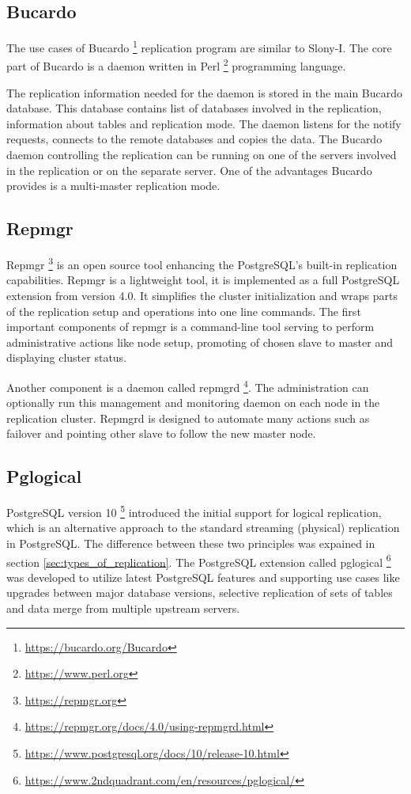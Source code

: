 \documentclass[
  digital, %
  twoside, %
  table,   %
  lof,     %
  lot,     %
]{fithesis3}
\begin{document}
\subsection{Bucardo}
The use cases of Bucardo \footnote{\url{https://bucardo.org/Bucardo}} replication program are similar to Slony-I. The core part of Bucardo is a daemon written in Perl \footnote{\url{https://www.perl.org}} programming language.

The replication information needed for the daemon is stored in the main Bucardo database. This database contains list of databases involved in the replication, information about tables and replication mode. The daemon listens for the notify requests, connects to the remote databases and copies the data. The Bucardo daemon controlling the replication can be running on one of the servers involved in the replication or on the separate server. One of the advantages Bucardo provides is a multi-master replication mode.

\subsection{Repmgr} \label{sec:repmgr}
Repmgr \footnote{\url{https://repmgr.org}} is an open source tool enhancing the PostgreSQL's built-in replication capabilities. Repmgr is a lightweight tool, it is implemented as a full PostgreSQL extension from version 4.0. It simplifies the cluster initialization and wraps parts of the replication setup and operations into one line commands.
The first important components of repmgr is a command-line tool serving to perform administrative actions like node setup, promoting of chosen slave to master and displaying cluster status.

Another component is a daemon called repmgrd \footnote{\url{https://repmgr.org/docs/4.0/using-repmgrd.html}}. The administration can optionally run this management and monitoring daemon on each node in the replication cluster. Repmgrd is designed to automate many actions such as failover and pointing other slave to follow the new master node.

\subsection{Pglogical}
PostgreSQL version 10 \footnote{\url{https://www.postgresql.org/docs/10/release-10.html}} introduced the initial support for logical replication, which is an alternative approach to the standard streaming (physical) replication in PostgreSQL. The difference between these two principles was expained in section \ref{sec:types_of_replication}. The PostgreSQL extension called pglogical \footnote{\url{https://www.2ndquadrant.com/en/resources/pglogical/}} was developed to utilize latest PostgreSQL features and supporting use cases like upgrades between major database versions, selective replication of sets of tables and data merge from multiple upstream servers.
\end{document}

